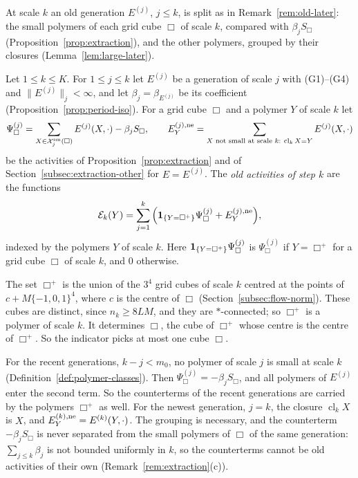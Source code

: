 At scale $k$ an old generation $E^{(j)}$, $j\le k$, is split as in Remark~\ref{rem:old-later}: the small polymers of each grid cube $\Box$ of scale $k$, compared with $\beta_jS_\Box$ (Proposition~\ref{prop:extraction}), and the other polymers, grouped by their closures (Lemma~\ref{lem:large-later}).

\begin{definition}\label{def:old-activities}
Let $1\le k\le K$. For $1\le j\le k$ let $E^{(j)}$ be a generation of scale $j$ with (G1)--(G4) and $\|E^{(j)}\|_j<\infty$, and let $\beta_j=\beta_{E^{(j)}}$ be its coefficient (Proposition~\ref{prop:period-iso}). For a grid cube $\Box$ and a polymer $Y$ of scale $k$ let
\[
\Psi^{(j)}_\Box=\sum_{X\in\cX^{\rm sm}_j(\Box)}E^{(j)}(X,\cdot)-\beta_jS_\Box,\qquad E^{(j),\rm ne}_Y=\sum_{X\text{ not small at scale }k:\ \operatorname{cl}_kX=Y}E^{(j)}(X,\cdot)
\]
be the activities of Proposition~\ref{prop:extraction} and of Section~\ref{subsec:extraction-other} for $E=E^{(j)}$. The \emph{old activities of step $k$} are the functions
\[
\mathcal E_k(Y)=\sum_{j=1}^k\Big(\mathbf 1_{\{Y=\Box^+\}}\Psi^{(j)}_\Box+E^{(j),\rm ne}_Y\Big),
\]
indexed by the polymers $Y$ of scale $k$. Here $\mathbf 1_{\{Y=\Box^+\}}\Psi^{(j)}_\Box$ is $\Psi^{(j)}_\Box$ if $Y=\Box^+$ for a grid cube $\Box$ of scale $k$, and $0$ otherwise.
\end{definition}

The set $\Box^+$ is the union of the $3^4$ grid cubes of scale $k$ centred at the points of $c+M\{-1,0,1\}^4$, where $c$ is the centre of $\Box$ (Section~\ref{subsec:flow-norm}). These cubes are distinct, since $n_k\ge8LM$, and they are $*$-connected; so $\Box^+$ is a polymer of scale $k$. It determines $\Box$, the cube of $\Box^+$ whose centre is the centre of $\Box^+$. So the indicator picks at most one cube $\Box$.

For the recent generations, $k-j<m_0$, no polymer of scale $j$ is small at scale $k$ (Definition~\ref{def:polymer-classes}). Then $\Psi^{(j)}_\Box=-\beta_jS_\Box$, and all polymers of $E^{(j)}$ enter the second term. So the counterterms of the recent generations are carried by the polymers $\Box^+$ as well. For the newest generation, $j=k$, the closure $\operatorname{cl}_kX$ is $X$, and $E^{(k),\rm ne}_Y=E^{(k)}(Y,\cdot)$. The grouping is necessary, and the counterterm $-\beta_jS_\Box$ is never separated from the small polymers of $\Box$ of the same generation: $\sum_{j\le k}\beta_j$ is not bounded uniformly in $k$, so the counterterms cannot be old activities of their own (Remark~\ref{rem:extraction}(c)).

